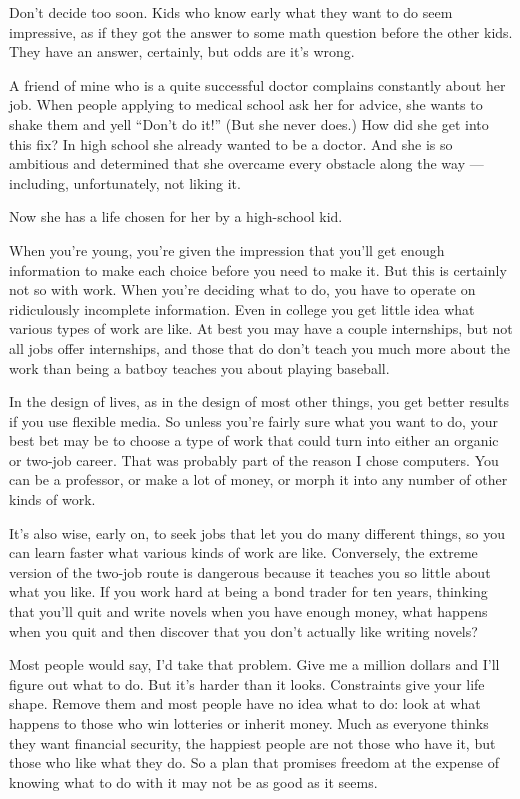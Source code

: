 Don't decide too soon. Kids who know early what they want to do seem
impressive, as if they got the answer to some math question before the
other kids. They have an answer, certainly, but odds are it's wrong.

A friend of mine who is a quite successful doctor complains constantly
about her job. When people applying to medical school ask her for
advice, she wants to shake them and yell ``Don't do it!'' (But she never
does.) How did she get into this fix? In high school she already wanted
to be a doctor. And she is so ambitious and determined that she overcame
every obstacle along the way --- including, unfortunately, not liking
it.

Now she has a life chosen for her by a high-school kid.

When you're young, you're given the impression that you'll get enough
information to make each choice before you need to make it. But this is
certainly not so with work. When you're deciding what to do, you have to
operate on ridiculously incomplete information. Even in college you get
little idea what various types of work are like. At best you may have a
couple internships, but not all jobs offer internships, and those that
do don't teach you much more about the work than being a batboy teaches
you about playing baseball.

In the design of lives, as in the design of most other things, you get
better results if you use flexible media. So unless you're fairly sure
what you want to do, your best bet may be to choose a type of work that
could turn into either an organic or two-job career. That was probably
part of the reason I chose computers. You can be a professor, or make a
lot of money, or morph it into any number of other kinds of work.

It's also wise, early on, to seek jobs that let you do many different
things, so you can learn faster what various kinds of work are like.
Conversely, the extreme version of the two-job route is dangerous
because it teaches you so little about what you like. If you work hard
at being a bond trader for ten years, thinking that you'll quit and
write novels when you have enough money, what happens when you quit and
then discover that you don't actually like writing novels?

Most people would say, I'd take that problem. Give me a million dollars
and I'll figure out what to do. But it's harder than it looks.
Constraints give your life shape. Remove them and most people have no
idea what to do: look at what happens to those who win lotteries or
inherit money. Much as everyone thinks they want financial security, the
happiest people are not those who have it, but those who like what they
do. So a plan that promises freedom at the expense of knowing what to do
with it may not be as good as it seems.

